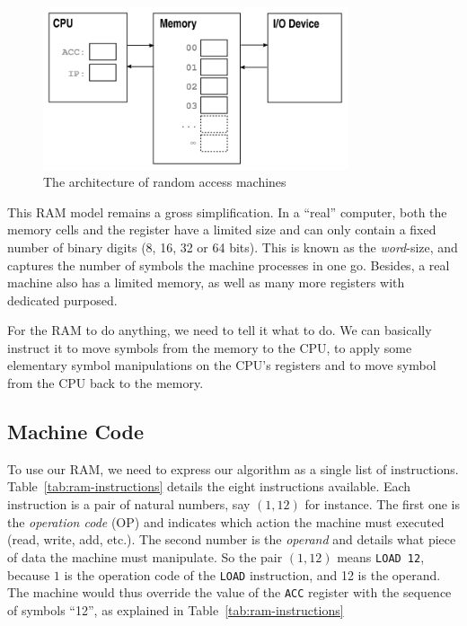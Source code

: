 \documentclass {aldast}
\begin{document}
\begin{figure}[htbp]
  \begin{center}
    \includegraphics[width=0.8\textwidth]{images/ram}
  \end{center}
  \caption{The architecture of random access machines}
  \label{fig:ram}
\end{figure}

This RAM model remains a gross
simplification. In a
``real'' computer, both the memory cells and the register have a
limited size and can only contain a fixed number of binary digits (8,
16, 32 or 64 bits). This is known as the \emph{word}-size, and
captures the number of symbols the machine processes in one
go. Besides, a real machine also has a limited memory, as well as many
more registers with dedicated purposed.

For the RAM to do anything, we need to tell it what to do. We can
basically instruct it to move symbols from the memory to the CPU, to
apply some elementary symbol manipulations on the CPU's registers and
to move symbol from the CPU back to the memory.

\subsection{Machine Code}
\label{sec:machine-code}

To use our RAM, we need to express our algorithm as a single list of
instructions. Table~\ref{tab:ram-instructions} details the eight
instructions available. Each instruction is a pair of natural numbers,
say $(1, 12)$ for instance. The first one is the \emph{operation code}
(OP) and indicates which action the machine must executed (read,
write, add, etc.). The second number is the \emph{operand} and details
what piece of data the machine must manipulate. So the pair
$(1, 12)$ means \texttt{LOAD 12}, because $1$ is the
operation code of the \texttt{LOAD} instruction, and 12 is the
operand. The machine would thus override the value of the \texttt{ACC}
register with the sequence of symbols ``12'', as explained in
Table~\ref{tab:ram-instructions}
\end{document}
